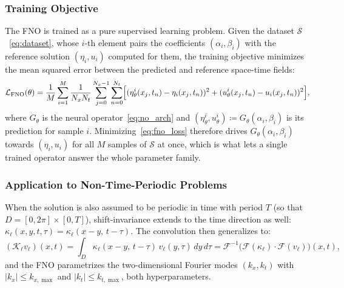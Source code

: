 \subsubsection{Training Objective}
\label{subsubsec:fno_loss}

The FNO is trained as a pure supervised learning problem. Given the dataset $\mathcal{S}$~\eqref{eq:dataset}, whose $i$-th element pairs the coefficients $(\alpha_i, \beta_i)$ with the reference solution $(\eta_i, u_i)$ computed for them, the training objective minimizes the mean squared error between the predicted and reference space-time fields:
\begin{equation}\label{eq:fno_loss}
    \mathcal{L}_{\text{FNO}}(\theta) = \frac{1}{M}\sum_{i=1}^{M}\frac{1}{N_x N_t}\sum_{j=0}^{N_x-1}\sum_{n=0}^{N_t}
    \Bigl[(\eta_\theta^i(x_j,t_n) - \eta_i(x_j,t_n))^2
    + (u_\theta^i(x_j,t_n) - u_i(x_j,t_n))^2\Bigr],
\end{equation}
where $G_\theta$ is the neural operator~\eqref{eq:no_arch} and $(\eta_\theta^i, u_\theta^i) \coloneqq G_\theta(\alpha_i, \beta_i)$ is its prediction for sample $i$. Minimizing~\eqref{eq:fno_loss} therefore drives $G_\theta(\alpha_i, \beta_i)$ towards $(\eta_i, u_i)$ for all $M$ samples of $\mathcal{S}$ at once, which is what lets a single trained operator answer the whole parameter family.

\subsubsection{Application to Non-Time-Periodic Problems}
\label{subsubsec:fno_time}

When the solution is also assumed to be periodic in time with period $T$ (so that $D = [0, 2\pi] \times [0, T]$), shift-invariance extends to the time direction as well: $\kappa_\ell(x, y, t, \tau) = \kappa_\ell(x - y,\, t - \tau)$. The convolution then generalizes to:
\begin{equation*}
    (\mathcal{K}_\ell v_\ell)(x,t)
    = \int_{D} \kappa_\ell(x-y,\,t-\tau)\,v_\ell(y,\tau)\,dy\,d\tau
    = \mathcal{F}^{-1}\!\Big(\mathcal{F}(\kappa_\ell)\cdot\mathcal{F}(v_\ell)\Big)(x,t),
\end{equation*}
and the FNO parametrizes the two-dimensional Fourier modes $(k_x, k_t)$ with $|k_x| \le k_{x,\max}$ and $|k_t| \le k_{t,\max}$, both hyperparameters.

